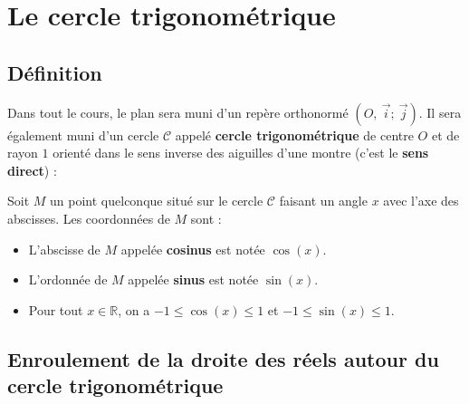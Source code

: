 


	
	
	

	\section{Le cercle trigonométrique}

	\subsection{Définition}

	Dans tout le cours, le plan sera muni d'un repère orthonormé $(O,\ \overrightarrow{i} ;\ \overrightarrow{j})$. Il sera également muni d'un cercle $\mathcal{C}$ appelé \textbf{cercle trigonométrique} de centre $O$ et de rayon $1$ orienté dans le sens inverse des aiguilles d'une montre (c'est le \textbf{sens direct}) :


	\begin{formula}
		Soit $M$ un point quelconque situé sur le cercle $\mathcal{C}$ faisant un angle $x$ avec l'axe des abscisses. Les coordonnées de $M$ sont :
		\begin{itemize}
			\item L'abscisse de $M$ appelée \textbf{cosinus} est notée $\cos(x)$.
			\item L'ordonnée de $M$ appelée \textbf{sinus} est notée $\sin(x)$.
			\item Pour tout $x \in \mathbb{R}$, on a $-1 \leq \cos(x) \leq 1$ et $-1 \leq \sin(x) \leq 1$.
		\end{itemize}
	\end{formula}

	\subsection{Enroulement de la droite des réels autour du cercle trigonométrique}


